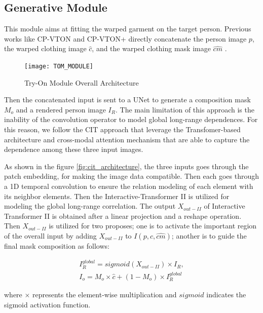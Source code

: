 \subsection{Generative Module}
This module aims at fitting the warped garment on the target person. Previous works like CP-VTON and CP-VTON+ directly concatenate the person image $p$, the warped clothing image
$\hat{c}$, and the warped clothing mask image $\hat{cm}$ . 

\begin{figure}[h]
\centering
\texttt{[image: TOM\_MODULE]}
\caption{Try-On Module Overall Architecture}
\label{fig:TOM_MODULE}
\end{figure}

Then the concatenated input is sent to a UNet \cite{u-net} to generate a composition mask $M_o$ and a rendered person image $I_R$. The main limitation of this approach is the inability of the convolution operator to model global long-range dependences. For this reason, we follow the CIT \cite{CIT} approach that leverage the Transfomer-based architecture and cross-modal attention mechanism that are able to capture the dependence among these three input images.


As shown in the figure \ref{fig:cit_architecture}, the three inputs goes through the patch embedding, for making the image data compatible.  Then each goes through a 1D temporal convolution to ensure the relation modeling of each element with its neighbor elements. Then the Interactive-Transformer II is utilized for modeling the global long-range correlation. The output $X_{out-II}$ of Interactive Transformer II is obtained after a linear projection and a reshape operation. Then $X_{out-II}$ is utilized for two proposes; one is to activate the important region of the overall input by adding $X_{out-II}$ to $I(p,\hat{c},\hat{cm})$; another is to guide the final mask composition as follows:

\begin{equation}
  \begin{aligned}
    I_{R}^{global} = sigmoid(X_{out-II}) \times I_R, \\
I_o = M_o \times \hat{c} + (1 - M_o) \times I_{R}^{global}
  \end{aligned}
\end{equation}

where $\times$ represents the element-wise multiplication and $sigmoid$ indicates the sigmoid activation function.

